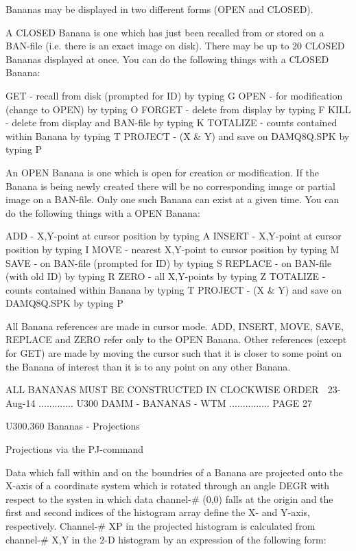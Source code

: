    Bananas may be displayed in two different forms (OPEN and CLOSED).
 
   A  CLOSED  Banana  is  one which has just been recalled from or stored on a
   BAN-file (i.e. there is an exact image on disk). There  may  be  up  to  20
   CLOSED  Bananas  displayed  at once. You can do the following things with a
   CLOSED Banana:
 
   GET      -  recall from disk (prompted for ID)     by typing  G
   OPEN     -  for modification (change to OPEN)      by typing  O
   FORGET   -  delete from display                    by typing  F
   KILL     -  delete from display and BAN-file       by typing  K
   TOTALIZE -  counts contained within Banana         by typing  T
   PROJECT  -  (X & Y) and save on DAMQ8Q.SPK         by typing  P
 
   An OPEN Banana is one which is open for creation or  modification.  If  the
   Banana  is  being  newly  created  there  will be no corresponding image or
   partial image on a BAN-file. Only one such Banana  can  exist  at  a  given
   time. You can do the following things with a OPEN Banana:
 
   ADD      -  X,Y-point at cursor position           by typing  A
   INSERT   -  X,Y-point at cursor position           by typing  I
   MOVE     -  nearest X,Y-point to cursor position   by typing  M
   SAVE     -  on BAN-file (prompted for ID)          by typing  S
   REPLACE  -  on BAN-file (with old ID)              by typing  R
   ZERO     -  all X,Y-points                         by typing  Z
   TOTALIZE -  counts contained within Banana         by typing  T
   PROJECT  -  (X & Y) and save on DAMQ8Q.SPK         by typing  P
 
   All  Banana  references  are  made in cursor mode. ADD, INSERT, MOVE, SAVE,
   REPLACE and ZERO refer only to the OPEN Banana.  Other  references  (except
   for  GET)  are  made  by  moving  the cursor such that it is closer to some
   point on the Banana of interest than it  is  to  any  point  on  any  other
   Banana.
 
               ALL BANANAS MUST BE CONSTRUCTED IN CLOCKWISE ORDER
    
   23-Aug-14 ............. U300  DAMM - BANANAS - WTM ............... PAGE  27
 
   U300.360  Bananas - Projections
 
   Projections via the PJ-command
 
   Data  which fall within and on the boundries of a Banana are projected onto
   the X-axis of a coordinate system which is rotated through  an  angle  DEGR
   with  respect  to  the  systen  in  which data channel-# (0,0) falls at the
   origin and the first and second indices of the histogram array  define  the
   X-  and  Y-axis,  respectively.  Channel-# XP in the projected histogram is
   calculated from channel-# X,Y in the 2-D histogram by an expression of  the
   following form:
 

